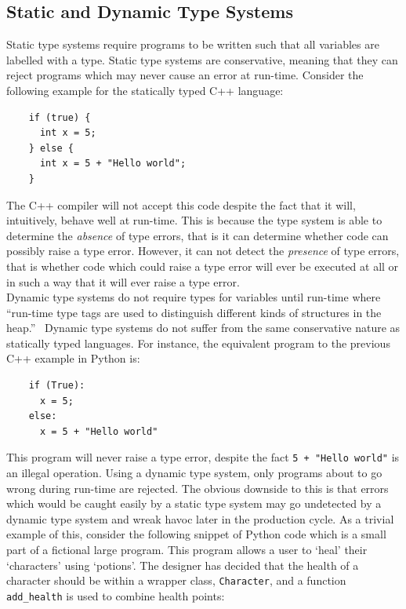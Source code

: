 \documentclass[12pt, titlepage]{article}
\begin{document}
\subsection{Static and Dynamic Type Systems}
Static type systems require programs to be written such that all variables are labelled with a type. Static type systems are conservative, meaning that they can reject programs which may never cause an error at run-time. Consider the following example for the statically typed C++ language:
\begin{lstlisting}
	if (true) {	
	  int x = 5;
	} else {
	  int x = 5 + "Hello world";
	}
\end{lstlisting}
The C++ compiler will not accept this code despite the fact that it will, intuitively, behave well at run-time. This is because the type system is able to determine the \textit{absence} of type errors, that is it can determine whether code can possibly raise a type error. However, it can not detect the \textit{presence} of type errors, that is whether code which could raise a type error will ever be executed at all or in such a way that it will ever raise a type error. \\
\indent Dynamic type systems do not require types for variables until run-time where ``run-time type tags are used to distinguish different kinds of structures in the heap.''~\cite{pierce02} Dynamic type systems do not suffer from the same conservative nature as statically typed languages. For instance, the equivalent program to the previous C++ example in Python is:
\begin{lstlisting}
	if (True):	
	  x = 5;
	else:
	  x = 5 + "Hello world"
\end{lstlisting}
This program will never raise a type error, despite the fact \texttt{5 + "Hello  world"} is an illegal operation. Using a dynamic type system, only programs about to go wrong during run-time are rejected. The obvious downside to this is that errors which would be caught easily by a static type system may go undetected by a dynamic type system and wreak havoc later in the production cycle. As a trivial example of this, consider the following snippet of Python code which is a small part of a fictional large program. This program allows a user to `heal' their `characters' using `potions'. The designer has decided that the health of a character should be within a wrapper class, \texttt{Character}, and a function \texttt{add\_health} is used to combine health points:
\end{document}

